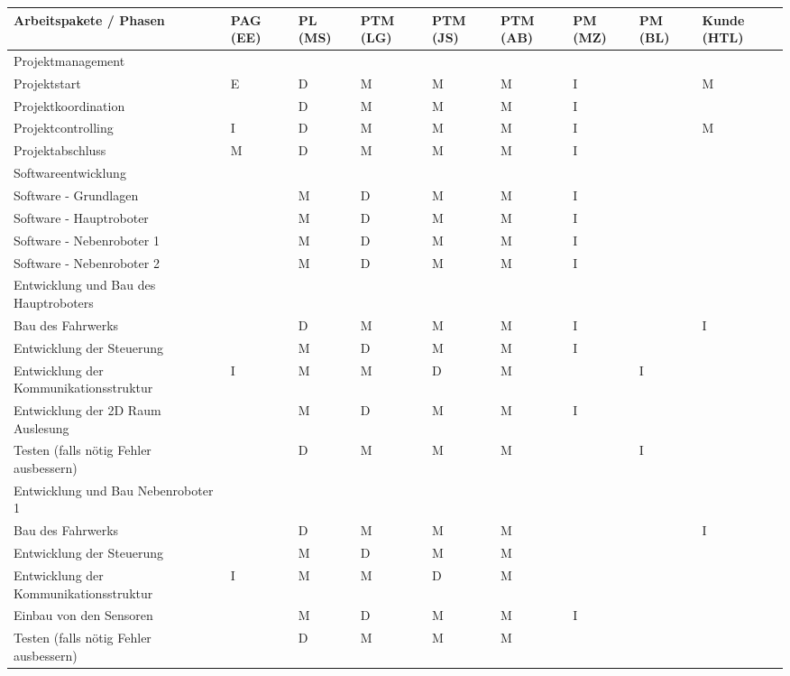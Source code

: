 \begin{longtable}[c]{|p{}|p{1cm}|p{1cm}|p{1cm}|p{1cm}|p{1cm}|p{1cm}|p{1cm}|p{}|}
\hline
\textbf{Arbeitspakete  /  Phasen} & \textbf{PAG (EE)} & \textbf{PL (MS)} & \textbf{PTM (LG)} & \textbf{PTM (JS)} & \textbf{PTM (AB)} & \textbf{PM (MZ)} & \textbf{PM (BL)} & \textbf{Kunde (HTL)} \\
\hline
Projektmanagement & & & & & & & & \\
\hline
Projektstart & E & D & M & M & M & I & & M \\
\hline
Projektkoordination & & D & M & M & M & I & & \\
\hline
Projektcontrolling & I & D & M & M & M & I & & M \\
\hline
Projektabschluss & M & D & M & M & M & I & & \\
\hline
Softwareentwicklung & & & & & & & & \\
\hline
Software - Grundlagen & & M & D & M & M & I & & \\
\hline
Software - Hauptroboter & & M & D & M & M & I & & \\
\hline
Software - Nebenroboter 1 & & M & D & M & M & I & & \\
\hline
Software - Nebenroboter 2 & & M & D & M & M & I & & \\
\hline
Entwicklung und Bau des Hauptroboters & & & & & & & & \\
\hline
Bau des Fahrwerks & & D & M & M & M & I & & I \\
\hline
Entwicklung der Steuerung & & M & D & M & M & I & & \\
\hline
Entwicklung der Kommunikationsstruktur & I & M & M & D & M & & I & \\
\hline
Entwicklung der 2D Raum Auslesung & & M & D & M & M & I & & \\
\hline
Testen (falls nötig Fehler ausbessern) & & D & M & M & M & & I & \\
\hline
Entwicklung und Bau Nebenroboter 1 & & & & & & & & \\
\hline
Bau des Fahrwerks & & D & M & M & M & & & I \\
\hline
Entwicklung der Steuerung & & M & D & M & M & & & \\
\hline
Entwicklung der Kommunikationsstruktur & I & M & M & D & M & & & \\
\hline
Einbau von den Sensoren & & M & D & M & M & I & & \\
\hline
Testen (falls nötig Fehler ausbessern) & & D & M & M & M & & & \\
\hline

\end{longtable}
